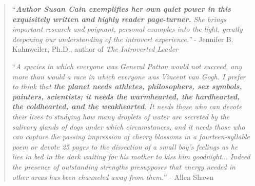 \documentclass[oneside]{article}
\numberwithin{equation}{section}
\begin{document}
\begin{quotation}
    ``\textit{\textbf{Author Susan Cain exemplifies her own quiet power in this exquisitely written and highly reader page-turner.} She brings important research and poignant, personal examples into the light, greatly deepening our understanding of the introvert experience.''} - Jennifer B. Kahnweiler, Ph.D., author of \textit{The Introverted Leader}
    
    ``\textit{A species in which everyone was General Patton would not succeed, any more than would a race in which everyone was Vincent van Gogh. I prefer to think that \textbf{the planet needs athletes, philosophers, sex symbols,  painters, scientists; it needs the warmhearted, the hardhearted, the coldhearted, and the weakhearted}. It needs those who can devote their lives to studying how many droplets of water are secreted by the salivary glands of dogs under which circumstances, and it needs those who can  capture the passing impression of cherry blossoms in a fourteen-syllable poem or devote 25 pages to the dissection of a small boy's feelings as he lies in bed in the dark waiting for his mother to kiss him goodnight$\ldots$ Indeed the presence of outstanding strengths presupposes that energy needed in other areas has been channeled away from them.}'' - Allen Shawn
\end{quotation}

\end{document}
